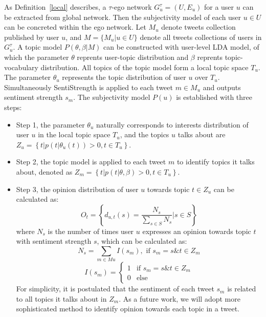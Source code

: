 \documentclass{acm_proc_article-sp}
\begin{document}
As Definition~\ref{local} describes, a $ \tau $-ego network $ G_{u}^{\tau}=\left( U,E_{u} \right)  $ for a user $ u $ can be extracted from global network. 
Then the subjectivity model of each user $ u \in U $ can be concreted within the ego network. 
Let $ M_{u}$ denote tweets collection published by user $ u $, and $ M=\lbrace M_{u} |u \in U \rbrace$ denote all tweets collections of users in $ G_{u}^{\tau} $. A topic model $P\left(\theta,\beta | M \right) $ can be constructed with user-level LDA model, of which the parameter $\theta$ reprents user-topic distribution and $\beta$ reprents topic-vocabulary distribution. All topics of the topic model form a local topic space $ T_{u} $. 
The parameter $ \theta_{u} $ represents the topic distribution of user $ u $ over $ T_{u} $. Simultaneously SentiStrength is applied to each tweet $ m \in M_{u} $ and outputs sentiment strength $ s_{m} $. 
The subjectivity model $P\left( u\right)  $ is established with three steps:
\begin{itemize}
\item Step 1, the parameter $ \theta_{u} $ naturally corresponds to interests distribution of user $ u $ in the local topic space $ T_{u} $, and the topics $ u $ talks about are $ Z_{u}= \left\lbrace t \vert p\left( t \vert \theta_{u}\left( t \right)  \right)>0 , t \in T_{u}\right\rbrace $.
\item Step 2, the topic model is applied to each tweet $ m $ to identify topics it talks about, denoted as $ Z_{m} =\left\lbrace t \vert p\left( t \vert \theta, \beta \right)>0 , t \in T_{u} \right\rbrace $.
\item Step 3, the opinion distribution of user $ u $ towards topic $ t \in Z_{u} $ can be calculated as: 
\begin{equation}
\label{opinionall}
O_{t}= \left\lbrace d_{u,t}\left( s\right)= \dfrac{N_{s}}{\sum_{s \in S} N_{s}} |s \in S \right\rbrace 
\end{equation}
where $ N_{s} $ is the number of times user $ u $ expresses an opinion towards topic $ t $ with sentiment strength $ s $, which can be calculated as:
\begin{equation}
\label{opinion1}
N_{s}=\sum_{m \in Mu} I\left( s_{m} \right) , \text{ if } s_{m}=s \& t \in Z_{m}
\end{equation}
\begin{equation}
\label{opinion2}
I\left( s_{m} \right)=\left\{
\begin{array}{ll}
{1} & \text{if } s_{m}=s \& t \in Z_{m}\\
{0} & \text{else}
\end{array}
\right.
\end{equation}
For simplicity, it is postulated that the sentiment of each tweet $ s_{m} $ is related to all topics it talks about in $ Z_{m} $. As a future work, we will adopt more sophisticated method to identify opinion towards each topic in a tweet.
\end{itemize}
\end{document}
